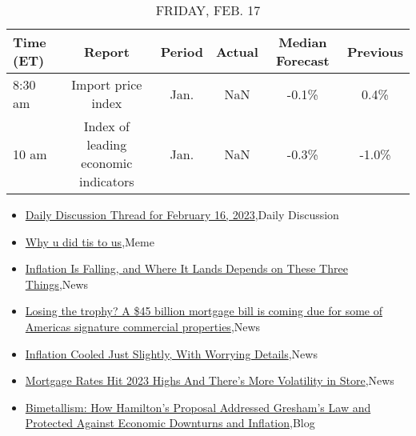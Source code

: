 \documentclass{article}%
\begin{document}
%


\begin{table}[htbp]%
\caption{FRIDAY, FEB. 17}%
\centering%
\begin{adjustbox}{width=1\textwidth}%
\begin{tabular}{lccccc}
\toprule
Time (ET) &                               Report & Period & Actual & Median Forecast & Previous \\
\midrule
  8:30 am &                   Import price index &   Jan. &    NaN &           -0.1\% &     0.4\% \\
    10 am & Index of leading economic indicators &   Jan. &    NaN &           -0.3\% &    -1.0\% \\
\bottomrule
\end{tabular}
%
\end{adjustbox}%
\end{table}

%
\begin{itemize}%
\item%
\href{https://reddit.com/r/wallstreetbets/comments/113nzvx/daily\_discussion\_thread\_for\_february\_16\_2023/}{Daily Discussion Thread for February 16, 2023},Daily Discussion%
\item%
\href{https://reddit.com/r/wallstreetbets/comments/113mbcb/why\_u\_did\_tis\_to\_us/}{Why u did tis to us},Meme%
\item%
\href{https://reddit.com/r/Economics/comments/112nui8/inflation\_is\_falling\_and\_where\_it\_lands\_depends/}{Inflation Is Falling, and Where It Lands Depends on These Three Things},News%
\item%
\href{https://reddit.com/r/Economics/comments/112idbt/losing\_the\_trophy\_a\_45\_billion\_mortgage\_bill\_is/}{Losing the trophy? A \$45 billion mortgage bill is coming due for some of Americas signature commercial properties},News%
\item%
\href{https://reddit.com/r/Economics/comments/112i51m/inflation\_cooled\_just\_slightly\_with\_worrying/}{Inflation Cooled Just Slightly, With Worrying Details},News%
\item%
\href{https://reddit.com/r/Economics/comments/112aov2/mortgage\_rates\_hit\_2023\_highs\_and\_theres\_more/}{Mortgage Rates Hit 2023 Highs And There's More Volatility in Store},News%
\item%
\href{https://reddit.com/r/Economics/comments/1129ghl/bimetallism\_how\_hamiltons\_proposal\_addressed/}{Bimetallism: How Hamilton's Proposal Addressed Gresham's Law and Protected Against Economic Downturns and Inflation},Blog%
\end{itemize}%
\end{document}
